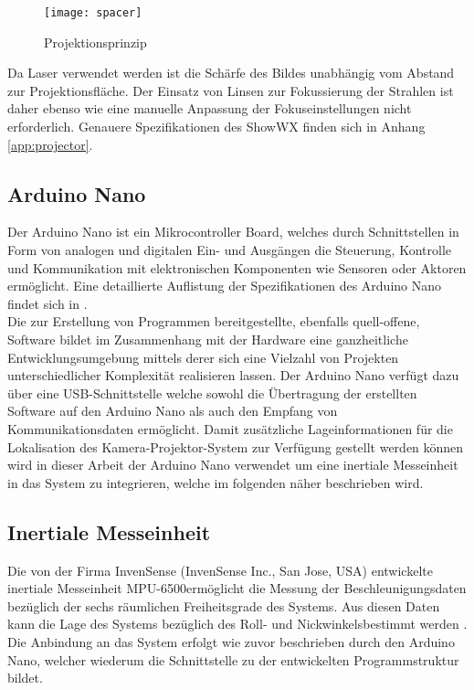\begin{figure}[ht]
	\begin{center}
		\texttt{[image: spacer]}
		\caption{Projektionsprinzip}
		\label{fig.projtech}
	\end{center}
\end{figure}

Da Laser verwendet werden ist die Schärfe des Bildes unabhängig vom Abstand zur Projektionsfläche. Der Einsatz von Linsen zur Fokussierung der Strahlen ist daher ebenso wie eine manuelle Anpassung der Fokuseinstellungen nicht erforderlich.  Genauere Spezifikationen des ShowWX finden sich in Anhang \ref{app:projector}.


\subsection{Arduino Nano}
\label{chap.arduino}
Der Arduino Nano ist ein  Mikrocontroller Board, welches durch Schnittstellen in Form von analogen und digitalen Ein- und Ausgängen die Steuerung, Kontrolle und Kommunikation mit elektronischen Komponenten wie Sensoren oder Aktoren ermöglicht. Eine detaillierte Auflistung der Spezifikationen des Arduino Nano findet sich in .\\
Die zur Erstellung von Programmen bereitgestellte, ebenfalls quell-offene, Software bildet im Zusammenhang mit der Hardware eine ganzheitliche Entwicklungsumgebung mittels derer sich eine Vielzahl von Projekten unterschiedlicher Komplexität realisieren lassen. Der Arduino Nano verfügt dazu über eine USB-Schnittstelle welche sowohl die Übertragung der erstellten Software auf den Arduino Nano als auch den Empfang von Kommunikationsdaten ermöglicht. Damit zusätzliche Lageinformationen für die Lokalisation des Kamera-Projektor-System zur Verfügung gestellt werden können wird in dieser Arbeit der Arduino Nano verwendet um eine inertiale Messeinheit in das System zu integrieren, welche im folgenden näher beschrieben wird.
\\


\subsection{Inertiale Messeinheit}
\label{chap.imu}
Die von der Firma InvenSense (InvenSense Inc., San Jose, USA) entwickelte inertiale Messeinheit MPU-6500\texttrademark \space ermöglicht die Messung der Beschleunigungsdaten bezüglich der sechs räumlichen Freiheitsgrade des Systems. Aus diesen Daten kann die Lage des Systems bezüglich des Roll- und Nickwinkels\red[footnote] bestimmt werden \cite{IMU}. Die Anbindung an das System erfolgt wie zuvor beschrieben durch den Arduino Nano, welcher wiederum die Schnittstelle zu der entwickelten Programmstruktur bildet.

